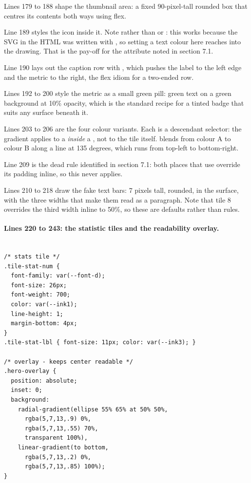 Lines 179 to 188 shape the thumbnail area: a fixed 90-pixel-tall rounded box that
centres its contents both ways using flex.

Line 189 styles the icon inside it. Note  rather than  or
: this works because the SVG in the HTML was written with
, so setting a text colour here reaches into the
drawing. That is the pay-off for the attribute noted in section 7.1.

Line 190 lays out the caption row with , which pushes the label
to the left edge and the metric to the right, the flex idiom for a two-ended row.

Lines 192 to 200 style the metric as a small green pill: green text on a green
background at 10\% opacity, which is the standard recipe for a tinted badge that
suits any surface beneath it.

Lines 203 to 206 are the four colour variants. Each is a descendant selector: the
gradient applies to a  \emph{inside} a , not to
the tile itself.  blends from colour A to
colour B along a line at 135 degrees, which runs from top-left to bottom-right.

Line 209 is the dead rule identified in section 7.1: both places that use
 override its padding inline, so this never applies.

Lines 210 to 218 draw the fake text bars: 7 pixels tall, rounded, in the 
surface, with the three widths that make them read as a paragraph. Note that tile
8 overrides the third width inline to 50\%, so these are defaults rather than
rules.

\paragraph{Lines 220 to 243: the statistic tiles and the readability overlay.}

\begin{lstlisting}[firstnumber=219,caption={\file{css/site.css}, lines 219--243}]

/* stats tile */
.tile-stat-num {
  font-family: var(--font-d);
  font-size: 26px;
  font-weight: 700;
  color: var(--ink1);
  line-height: 1;
  margin-bottom: 4px;
}
.tile-stat-lbl { font-size: 11px; color: var(--ink3); }

/* overlay - keeps center readable */
.hero-overlay {
  position: absolute;
  inset: 0;
  background:
    radial-gradient(ellipse 55% 65% at 50% 50%,
      rgba(5,7,13,.9) 0%,
      rgba(5,7,13,.55) 70%,
      transparent 100%),
    linear-gradient(to bottom,
      rgba(5,7,13,.2) 0%,
      rgba(5,7,13,.85) 100%);
}
\end{lstlisting}

